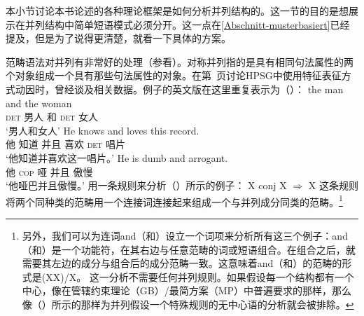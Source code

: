 \begin{exe}
\begin{xlist}[iv.]
\begin{exe}
\begin{xlist}[iv.]
本小节讨论本书论述的各种理论框架是如何分析并列结构的。这一节的目的是想展示在并列结构中简单短语模式必须分开。这一点在\ref{Abschnitt-musterbasiert}已经提及，但是为了说得更清楚，就看一下具体的方案。

范畴语法对并列有非常好的处理（参看\citealp{Steedman91a}）。对称并列指的是具有相同句法属性的两个对象组成一个具有那些句法属性的对象。在第~\pageref{Seite-HPSG-Koordination}页讨论HPSG中使用特征表征方式动因时，曾经谈及相关数据。例子的英文版在这里重复表示为（）：
\eal
\ex 
\gll the man and the woman\\
     \textsc{det} 男人 和 \textsc{det} 女人\\
\glt `男人和女人'
\ex 
\gll He knows and loves this record.\\
     他 知道 并且 喜欢 \textsc{det} 唱片\\
\glt `他知道并喜欢这一唱片。'
\ex 
\gll He is dumb and arrogant.\\
     他 \textsc{cop} 哑 并且  傲慢\\
\glt `他哑巴并且傲慢。'
\zl
\citet{Steedman91a}用一条规则来分析（）所示的例子：
\ea
X conj X $\Rightarrow$ X
\z
这条规则将两个同种类的范畴用一个连接词连接起来组成一个与并列成分同类的范畴。\footnote{%
另外，我们可以为连词and（和）设立一个词项来分析所有这三个例子：and（和）是一个功能符，在其右边与任意范畴的词或短语组合。在组合之后，就需要其左边的成分与组合后的成分范畴一致。这意味着and（和）的范畴的形式是(X\bs X)/X。
这一分析不需要任何并列规则。如果假设每一个结构都有一个中心，像在\indexgbc 管辖约束理论（GB）/最简方案（MP）\indexmpc 中普遍要求的那样，那么像（）所示的那样为并列假设一个特殊规则的无中心语的分析就会被排除。
}
\end{xlist}
\end{exe}
\end{xlist}
\end{exe}

